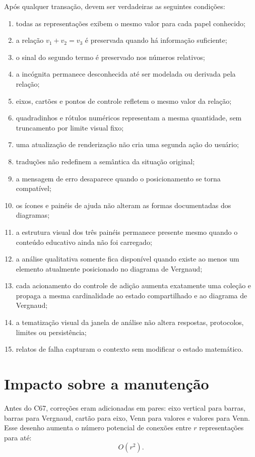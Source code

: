 \documentclass[12pt,a4paper]{article}
\begin{document}
Após qualquer transação, devem ser verdadeiras as seguintes condições:
\begin{enumerate}[noitemsep]
  \item todas as representações exibem o mesmo valor para cada papel conhecido;
  \item a relação $v_1+v_2=v_3$ é preservada quando há informação suficiente;
  \item o sinal do segundo termo é preservado nos números relativos;
  \item a incógnita permanece desconhecida até ser modelada ou derivada pela relação;
  \item eixos, cartões e pontos de controle refletem o mesmo valor da relação;
  \item quadradinhos e rótulos numéricos representam a mesma quantidade, sem truncamento por limite visual fixo;
  \item uma atualização de renderização não cria uma segunda ação do usuário;
  \item traduções não redefinem a semântica da situação original;
  \item a mensagem de erro desaparece quando o posicionamento se torna compatível;
  \item os ícones e painéis de ajuda não alteram as formas documentadas dos diagramas;
  \item a estrutura visual dos três painéis permanece presente mesmo quando o conteúdo educativo ainda não foi carregado;
  \item a análise qualitativa somente fica disponível quando existe ao menos um elemento atualmente posicionado no diagrama de Vergnaud;
  \item cada acionamento do controle de adição aumenta exatamente uma coleção e propaga a mesma cardinalidade ao estado compartilhado e ao diagrama de Vergnaud;
  \item a tematização visual da janela de análise não altera respostas, protocolos, limites ou persistência;
  \item relatos de falha capturam o contexto sem modificar o estado matemático.
\end{enumerate}

\section{Impacto sobre a manutenção}

Antes do C67, correções eram adicionadas em pares: eixo vertical para barras, barras para Vergnaud, cartão para eixo, Venn para valores e valores para Venn. Esse desenho aumenta o número potencial de conexões entre $r$ representações para até:
\[
O(r^2).
\]
\end{document}
